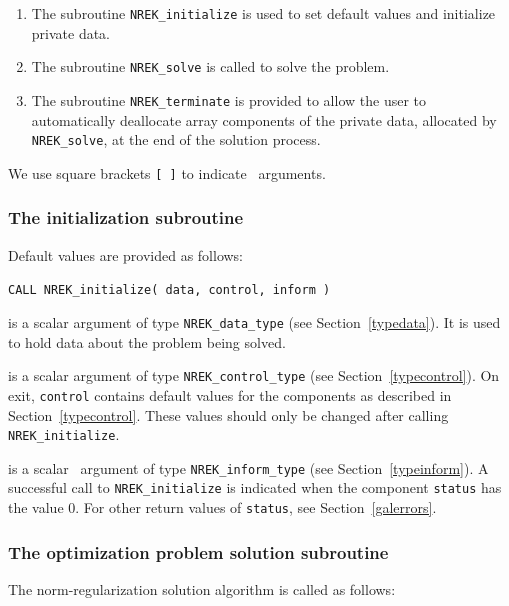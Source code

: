 \documentclass{galahad}
\newcommand{\packagename}{NREK}
\begin{document}
\begin{enumerate}
\item The subroutine
      {\tt \packagename\_initialize}
      is used to set default values and initialize private data.
\item The subroutine
      {\tt \packagename\_solve}
      is called to solve the problem.
\item The subroutine
      {\tt \packagename\_terminate}
      is provided to allow the user to automatically deallocate array
       components of the private data, allocated by
       {\tt \packagename\_solve},
       at the end of the solution process.
\end{enumerate}
We use square brackets {\tt [ ]} to indicate \optional\ arguments.


\subsubsection{The initialization subroutine}\label{subinit}
 Default values are provided as follows:

\vspace*{2mm}
\hskip0.5in
{\tt CALL \packagename\_initialize( data, control, inform )}

\begin{description}

 is a scalar \intentinout argument of type
{\tt \packagename\_data\_type}
(see Section~\ref{typedata}). It is used to hold data about the problem being
solved.

 is a scalar \intentout argument of type
{\tt \packagename\_control\_type}
(see Section~\ref{typecontrol}).
On exit, {\tt control} contains default values for the components as
described in Section~\ref{typecontrol}.
These values should only be changed after calling
{\tt \packagename\_initialize}.

 is a scalar \intentout\ argument of type
{\tt \packagename\_inform\_type}
(see Section~\ref{typeinform}). A successful call to
{\tt \packagename\_initialize}
is indicated when the  component {\tt status} has the value 0.
For other return values of {\tt status}, see Section~\ref{galerrors}.

\end{description}


\subsubsection{The optimization problem solution subroutine}
The norm-regularization solution algorithm is called as follows:
\end{document}

